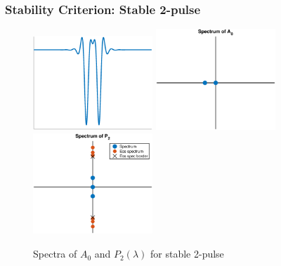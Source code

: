 \documentclass[16pt]{beamer}
\begin{document}
\begin{frame}
\frametitle{Stability Criterion: Stable 2-pulse}
\begin{figure}
\begin{center}
\includegraphics[width=4.5cm]{images/stable1.eps}
\includegraphics[width=4.5cm]{images/stable1A0.eps}
\includegraphics[width=4.5cm]{images/stable1spec.eps}
\caption{Spectra of $A_0$ and $P_2(\lambda)$ for stable 2-pulse}
\end{center}
\end{figure}
\end{frame}
\end{document}

